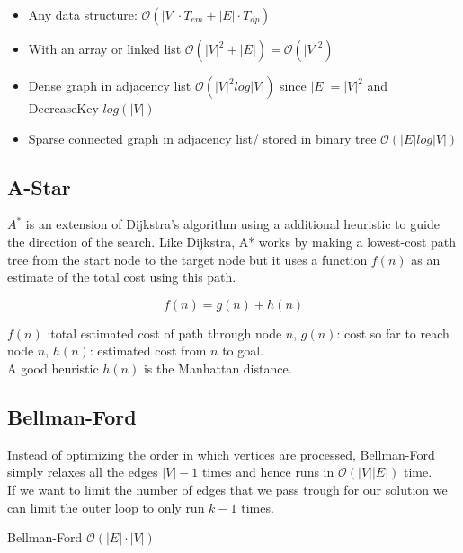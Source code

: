 \documentclass[9pt,landscape,a4paper, table]{extarticle}
\begin{document}
\begin{multicols*}{3}
\begin{itemize}
    \item Any data structure: $\mathcal{O}(|V|\cdot T_{em} + |E| \cdot T_{dp})$
    \item With an array or linked list $\mathcal{O}(|V|^2 + |E|) = \mathcal{O}(|V|^2) $
    \item Dense graph in adjacency list $\mathcal{O}(|V|^2 log |V|) $ since $|E| = |V|^2$ and DecreaseKey $log(|V|)$
    \item Sparse connected graph in adjacency list/ stored in binary tree $\mathcal{O}(|E|  log |V|) $
\end{itemize}

\subsection{A-Star}

$A^*$ is an extension of Dijkstra's algorithm using a additional heuristic to guide the direction of the search. Like Dijkstra, A* works by making a lowest-cost path tree from the start node to the target node but it uses a function $f(n)$ as an estimate of the total cost using this path. 

$$f(n) = g(n) + h(n)$$

$f(n)$ :total estimated cost of path through node $n$,
$g(n)$: cost so far to reach node $n$,
$h(n)$: estimated cost from $n$ to goal.\\

A good heuristic $h(n)$ is the Manhattan distance. 

\subsection{Bellman-Ford}

Instead of optimizing the order in which vertices are processed, Bellman-Ford simply relaxes all the edges $|V| - 1$ times and hence runs in $\mathcal{O}(|V| |E|)$ time.\\
If we want to limit the number of edges that we pass trough for our solution we can limit the outer loop to only run $k - 1$ times.

{\scriptsize
\begin{algorithm}[H]
    \caption{Bellman-Ford $\mathcal{O}(|E| \cdot |V|) $}
    
    \SetAlgoLined
    
\end{algorithm}}
\end{multicols*}
\end{document}
